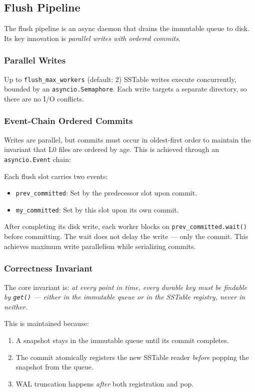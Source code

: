 \documentclass[conference]{IEEEtran}
\begin{document}
\subsection{Flush Pipeline}

The flush pipeline is an async daemon that drains the immutable queue to disk. Its key innovation is \textit{parallel writes with ordered commits}.

\subsubsection{Parallel Writes}

Up to \texttt{flush\_max\_workers} (default: 2) SSTable writes execute concurrently, bounded by an \texttt{asyncio.Semaphore}. Each write targets a separate directory, so there are no I/O conflicts.

\subsubsection{Event-Chain Ordered Commits}

Writes are parallel, but commits must occur in oldest-first order to maintain the invariant that L0 files are ordered by age. This is achieved through an \texttt{asyncio.Event} chain:

Each flush slot carries two events:
\begin{itemize}[leftmargin=*]
    \item \texttt{prev\_committed}: Set by the predecessor slot upon commit.
    \item \texttt{my\_committed}: Set by this slot upon its own commit.
\end{itemize}

After completing its disk write, each worker blocks on \texttt{prev\_committed.wait()} before committing. The wait does not delay the write --- only the commit. This achieves maximum write parallelism while serializing commits.

\subsubsection{Correctness Invariant}

The core invariant is: \textit{at every point in time, every durable key must be findable by \texttt{get()} --- either in the immutable queue or in the SSTable registry, never in neither.}

This is maintained because:
\begin{enumerate}[leftmargin=*]
    \item A snapshot stays in the immutable queue until its commit completes.
    \item The commit atomically registers the new SSTable reader \emph{before} popping the snapshot from the queue.
    \item WAL truncation happens \emph{after} both registration and pop.
\end{enumerate}
\end{document}
